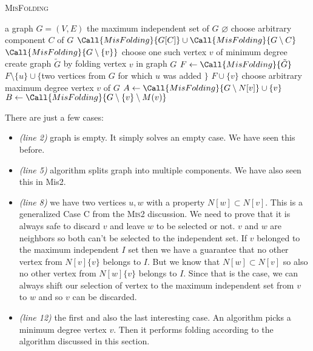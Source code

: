 \begin{algorithm}[H]
\caption{\textsc{MisFolding}}\label{alg:misfolding}
\begin{algorithmic}[1]
\Require a graph $G=(V,E)$
\Ensure the maximum independent set of $G$
        \State \Return $\varnothing$
    \EndIf
         \State choose arbitrary component $C$ of $G$
         \State \Return $\Call{MisFolding}{G[C]} \cup \Call{MisFolding}{G\setminus C}$
    \EndIf
         \State \Return $\Call{MisFolding}{G\setminus \{v\}}$
    \EndIf
        \State choose one such vertex $v$ of minimum degree
        \State create graph $\tilde{G}$ by folding vertex $v$ in graph $G$
        \State $F \gets \Call{MisFolding}{\tilde{G}}$
            \State \Return $F \setminus \{u\} \cup\{$two vertices from $G$ for which $u$ was added $\}$
        \Else
            \State \Return $F \cup \{v\}$
        \EndIf
    \EndIf
    \State choose arbitrary maximum degree vertex $v$ of $G$
    \State $A \gets \Call{MisFolding}{G\setminus N[v]} \cup \{v\}$
    \State $B \gets \Call{MisFolding}{G\setminus \{v\} \setminus M(v)}$
    \State \Return {}
\EndProcedure
\end{algorithmic}
\end{algorithm}

There are just a few cases:

\begin{itemize}
    \item \textit{(line 2)} graph is empty. It simply solves an empty case. We have seen this before.
    \item \textit{(line 5)} algorithm splits graph into multiple components. We have also seen this in Mis2.
    \item \textit{(line 8)} we have two vertices $u,w$ with a property $N[w] \subset N[v]$. This is a generalized Case C from the \textsc{Mis2} discussion. We need to prove that it is always safe to discard $v$ and leave $w$ to be selected or not. $v$ and $w$ are neighbors so both can't be selected to the independent set. If $v$ belonged to the maximum independent $I$ set then we have a  guarantee that no other vertex from $N[v]\{v\}$ belongs to $I$. But we know that $N[w] \subset N[v]$ so also no other vertex from $N[w]\{v\}$ belongs to $I$. Since that is the case, we can always shift our selection of vertex to the maximum independent set from $v$ to $w$ and so $v$ can be discarded.
    
    \item \textit{(line 12)} the first and also the last interesting case. An algorithm picks a minimum degree vertex $v$. Then it performs folding according to the algorithm discussed in this section.
\end{itemize} 

